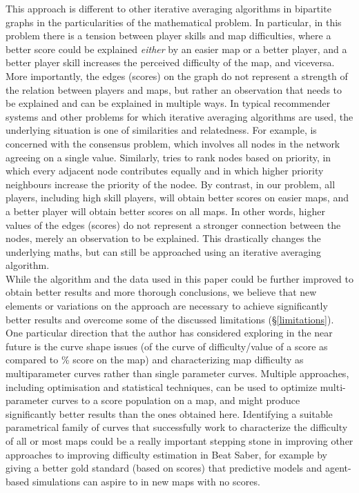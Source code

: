 \documentclass[12pt,a4paper]{article}
\begin{document}
This approach is different to other iterative averaging algorithms in bipartite graphs \cite{consensus_bipartite_graphs, iterative_algorithm_priority_pairwise, averaging_process_bipartite_graphs} in the particularities of the mathematical problem. In particular, in this problem there is a tension between player skills and map difficulties, where a better score could be explained {\emph{either}} by an easier map or a better player, and a better player skill increases the perceived difficulty of the map, and viceversa. More importantly, the edges (scores) on the graph do not represent a strength of the relation between players and maps, but rather an observation that needs to be explained and can be explained in multiple ways. In typical recommender systems and other problems for which iterative averaging algorithms are used, the underlying situation is one of similarities and relatedness. For example, \cite{consensus_bipartite_graphs} is concerned with the consensus problem, which involves all nodes in the network agreeing on a single value. Similarly, \cite{iterative_algorithm_priority_pairwise} tries to rank nodes based on priority, in which every adjacent node contributes equally and in which higher priority neighbours increase the priority of the nodee. By contrast, in our problem, all players, including high skill players, will obtain better scores on easier maps, and a better player will obtain better scores on all maps. In other words, higher values of the edges (scores) do not represent a stronger connection between the nodes, merely an observation to be explained. This drastically changes the underlying maths, but can still be approached using an iterative averaging algorithm.\\

While the algorithm and the data used in this paper could be further improved to obtain better results and more thorough conclusions, we believe that new elements or variations on the approach are necessary to achieve significantly better results and overcome some of the discussed limitations (\S \ref{limitations}). One particular direction that the author has considered exploring in the near future is the curve shape issues (of the curve of difficulty/value of a score as compared to \% score on the map) and characterizing map difficulty as multiparameter curves rather than single parameter curves. Multiple approaches, including optimisation and statistical techniques, can be used to optimize multi-parameter curves to a score population on a map, and might produce significantly better results than the ones obtained here. Identifying a suitable parametrical family of curves that successfully work to characterize the difficulty of all or most maps could be a really important stepping stone in improving other approaches to improving difficulty estimation in Beat Saber, for example by giving a better gold standard (based on scores) that predictive models and agent-based simulations can aspire to in new maps with no scores.
\end{document}
